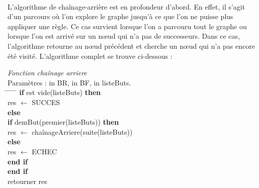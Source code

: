\documentclass {report}
\begin{document}
\paragraph{}
L'algorithme de chaînage-arrière est en profondeur d'abord. En effet, il s'agit d'un parcours où l'on explore le graphe jusqu'à ce que l'on ne puisse plus appliquer une règle. Ce cas survient lorsque l'on a parcouru tout le graphe ou lorsque l'on est arrivé sur un nœud qui n'a pas de successeurs. Dans ce cas, l'algorithme retourne au nœud précédent et cherche un nœud qui n'a pas encore été visité. L'algorithme complet se trouve ci-dessous :
\begin{tabbing}
\textit{Fonction chaînage arriere}\\
Paramètres : in BR, in BF, in listeButs.\\
\hspace{0.5cm} \= \hspace{0.5cm} \= \hspace{0.5cm} \= \hspace{0.5cm} \= \hspace{0.5cm} \= \kill
\> \textbf{if} est vide(listeButs) \textbf{then}\\
\> \> res $\leftarrow$ SUCCES\\
\> \textbf{else}\\
\> \> \textbf{if} demBut(premier(listeButs)) \textbf{then}\\
\> \> \> res $\leftarrow$ chaînageArriere(suite(listeButs))\\
\> \> \textbf{else}\\
\> \> \> res $\leftarrow$ ECHEC\\
\> \> \textbf{end if}\\
\> \textbf{end if}\\
retourner res\\
\end{tabbing}
\end{document}
